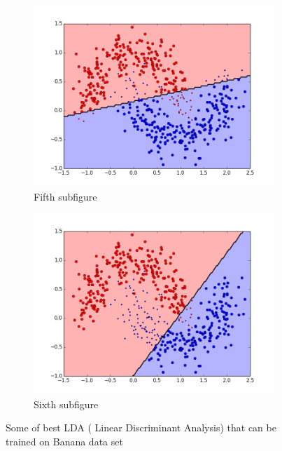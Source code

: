 \begin{figure}[t!]
\medskip
\begin{subfigure}{0.48\textwidth}
\includegraphics[width=\linewidth]{figs/Banana/147All-Classifiers}
\caption{Fifth subfigure} \label{fig:Banana_all_single_e}
\end{subfigure}\hspace*{\fill}
\begin{subfigure}{0.48\textwidth}
\includegraphics[width=\linewidth]{figs/Banana/160All-Classifiers}
\caption{Sixth subfigure} \label{fig:Banana_all_single_f}
\end{subfigure}

\caption{Some of best LDA ( Linear Discriminant Analysis) that can be trained on Banana data set} \label{fig:Banana_all_single}
\end{figure}


